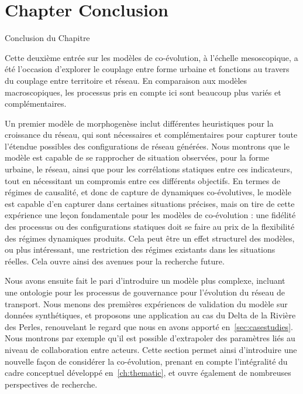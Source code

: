

\newpage


\section*{Chapter Conclusion}{Conclusion du Chapitre}


Cette deuxième entrée sur les modèles de co-évolution, à l'échelle mesoscopique, a été l'occasion d'explorer le couplage entre forme urbaine et fonctions au travers du couplage entre territoire et réseau. En comparaison aux modèles macroscopiques, les processus pris en compte ici sont beaucoup plus variés et complémentaires.

Un premier modèle de morphogenèse inclut différentes heuristiques pour la croissance du réseau, qui sont nécessaires et complémentaires pour capturer toute l'étendue possibles des configurations de réseau générées. Nous montrons que le modèle est capable de se rapprocher de situation observées, pour la forme urbaine, le réseau, ainsi que pour les corrélations statiques entre ces indicateurs, tout en nécessitant un compromis entre ces différents objectifs. En termes de régimes de causalité, et donc de capture de dynamiques co-évolutives, le modèle est capable d'en capturer dans certaines situations précises, mais on tire de cette expérience une leçon fondamentale pour les modèles de co-évolution : une fidélité des processus ou des configurations statiques doit se faire au prix de la flexibilité des régimes dynamiques produits. Cela peut être un effet structurel des modèles, ou plus intéressant, une restriction des régimes existants dans les situations réelles. Cela ouvre ainsi des avenues pour la recherche future.


Nous avons ensuite fait le pari d'introduire un modèle plus complexe, incluant une ontologie pour les processus de gouvernance pour l'évolution du réseau de transport. Nous menons des premières expériences de validation du modèle sur données synthétiques, et proposons une application au cas du Delta de la Rivière des Perles, renouvelant le regard que nous en avons apporté en~\ref{sec:casestudies}. Nous montrons par exemple qu'il est possible d'extrapoler des paramètres liés au niveau de collaboration entre acteurs. Cette section permet ainsi d'introduire une nouvelle façon de considérer la co-évolution, prenant en compte l'intégralité du cadre conceptuel développé en~\ref{ch:thematic}, et ouvre également de nombreuses perspectives de recherche.




\stars

